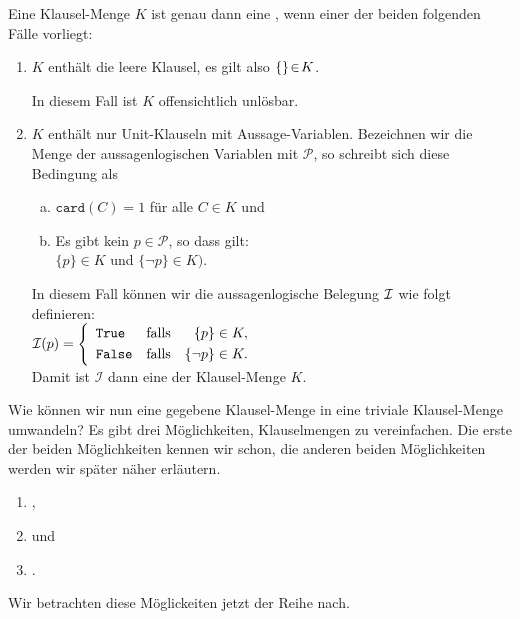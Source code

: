 \begin{Definition}
  Eine Klausel-Menge $K$ ist genau dann eine , wenn
  einer der beiden folgenden Fälle vorliegt:
  \begin{enumerate}
  \item $K$ enthält die leere Klausel, es gilt also $\{\} \!\in\! K$.

        In diesem Fall ist $K$ offensichtlich unlösbar.
  \item $K$ enthält nur Unit-Klauseln mit \underline{} Aussage-Variablen.
        Bezeichnen wir die Menge der aussagenlogischen Variablen mit $\mathcal{P}$,
        so schreibt sich diese Bedingung als 
        \begin{enumerate}[(a)]
        \item $\texttt{card}(C) = 1$ \quad für alle $C \in K$ \quad und
        \item Es gibt kein $p\in\mathcal{P}$, so dass gilt: 
              \\[0.2cm]
              \hspace*{1.3cm}
              $\{p\} \in K$ \quad und \quad $\{\neg p\} \in K\bigr)$.
        \end{enumerate}
        In diesem Fall können wir die aussagenlogische Belegung $\mathcal{I}$ wie folgt definieren:
        \\[0.2cm]
        \hspace*{1.3cm}
        $\mathcal{I}(p) = \left\{
                   \begin{array}{lcr}
                     \texttt{True}  & \mbox{falls} & \{p\}      \in K, \\[0.1cm]
                     \texttt{False} & \mbox{falls} & \{\neg p\} \in K.
                   \end{array}
                   \right.
        $
        \\[0.2cm]
        Damit ist $\mathcal{I}$ dann eine  der Klausel-Menge $K$. \eox
  \end{enumerate}
\end{Definition}

Wie können wir nun eine gegebene Klausel-Menge in eine triviale Klausel-Menge umwandeln?
Es gibt drei Möglichkeiten, Klauselmengen zu vereinfachen.  Die erste der beiden Möglichkeiten kennen wir
schon, die anderen beiden Möglichkeiten werden wir später näher erläutern.
\begin{enumerate}
\item {},
\item {} und
\item {}.
\end{enumerate}
Wir betrachten diese Möglickeiten jetzt der Reihe nach.

